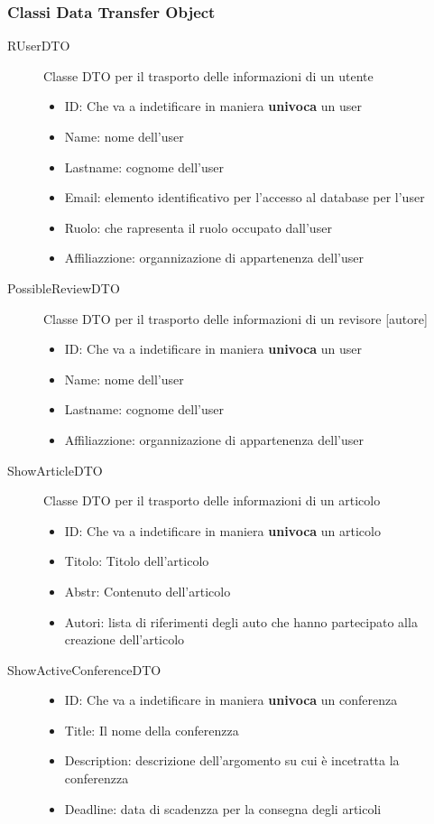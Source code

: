 \subsubsection{Classi Data Transfer Object}
\begin{description}
\item[RUserDTO] Classe DTO per il trasporto delle informazioni di un utente
\begin{itemize}
\item ID: Che va a indetificare in maniera \textbf{univoca} un user
\item Name: nome dell'user
\item Lastname: cognome dell'user
\item Email: elemento identificativo per l'accesso al database per l'user
\item Ruolo: che rapresenta il ruolo occupato dall'user
\item Affiliazzione: organnizazione di appartenenza dell'user
\end{itemize}
\item[PossibleReviewDTO] Classe DTO per il trasporto delle informazioni di un revisore [autore]
\begin{itemize}
\item ID: Che va a indetificare in maniera \textbf{univoca} un user
\item Name: nome dell'user
\item Lastname: cognome dell'user
\item Affiliazzione: organnizazione di appartenenza dell'user
\end{itemize}
\item[ShowArticleDTO] Classe DTO per il trasporto delle informazioni di un articolo
\begin{itemize}
\item ID: Che va a indetificare in maniera \textbf{univoca} un articolo
\item Titolo: Titolo dell'articolo
\item Abstr: Contenuto dell'articolo
\item Autori: lista di riferimenti degli auto che hanno partecipato alla creazione dell'articolo
\end{itemize}
\item[ShowActiveConferenceDTO]
\begin{itemize}
\item ID: Che va a indetificare in maniera \textbf{univoca} un conferenza
\item Title: Il nome della conferenzza
\item Description: descrizione dell'argomento su cui è incetratta la conferenzza
\item Deadline: data di scadenzza per la consegna degli articoli
\end{itemize}
\end{description}


